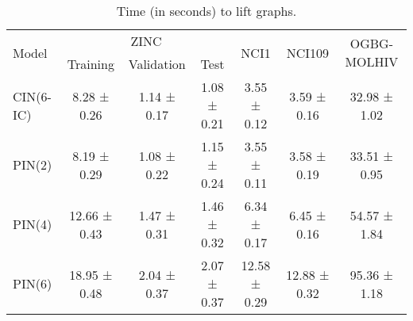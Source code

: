 \documentclass[letterpaper]{article} \usepackage{aaai24}  \usepackage{times}  \usepackage{helvet}  \usepackage{courier}  \usepackage[hyphens]{url}  \usepackage{graphicx} \urlstyle{rm} \def\UrlFont{\rm}  \usepackage{natbib}  \usepackage{caption} \frenchspacing  \setlength{\pdfpagewidth}{8.5in} \setlength{\pdfpageheight}{11in} \usepackage{algorithm}
\begin{document}
\begin{table*}[t]
\centering
\begin{tabular}{@{}lcccccc@{}}
\toprule
\multirow{2}{*}{Model} & \multicolumn{3}{c}{ZINC}                    & \multirow{2}{*}{NCI1} & \multirow{2}{*}{NCI109} & \multirow{2}{*}{OGBG-MOLHIV} \\ \cmidrule(lr){2-4}
                       & Training & Validation & Test    &                       &                         &                         \\ \midrule
CIN(6-IC)              & 8.28 ± 0.26  & 1.14 ± 0.17    & 1.08 ± 0.21 & 3.55 ± 0.12           & 3.59 ± 0.16             & 32.98 ± 1.02            \\
PIN(2)                 & 8.19 ± 0.29  & 1.08 ± 0.22    & 1.15 ± 0.24 & 3.55 ± 0.11           & 3.58 ± 0.19             & 33.51 ± 0.95            \\
PIN(4)                 & 12.66 ± 0.43 & 1.47 ± 0.31    & 1.46 ± 0.32 & 6.34 ± 0.17           & 6.45 ± 0.16             & 54.57 ± 1.84            \\
PIN(6)                 & 18.95 ± 0.48 & 2.04 ± 0.37    & 2.07 ± 0.37 & 12.58 ± 0.29          & 12.88 ± 0.32            & 95.36 ± 1.18            \\ \bottomrule
\end{tabular}\caption{Time (in seconds) to lift graphs.}
\label{tab:lift-graph}
\vspace{5mm}


\end{table*}
\end{document}
